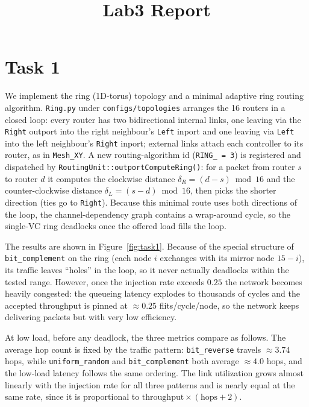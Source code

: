 \documentclass[11pt]{article}
\title{\textbf{Lab3 Report}}
\author{}
\date{}
\begin{document}
\maketitle

\section*{Task 1}

We implement the ring (1D-torus) topology and a minimal adaptive ring routing
algorithm. \texttt{Ring.py} under \texttt{configs/topologies} arranges the 16
routers in a closed loop: every router has two bidirectional internal links,
one leaving via the \texttt{Right} outport into the right neighbour's
\texttt{Left} inport and one leaving via \texttt{Left} into the left
neighbour's \texttt{Right} inport; external links attach each controller to
its router, as in \texttt{Mesh\_XY}. A new routing-algorithm id
(\texttt{RING\_ = 3}) is registered and dispatched by
\texttt{RoutingUnit::outportComputeRing()}: for a packet from router $s$ to
router $d$ it computes the clockwise distance $\delta_R = (d-s) \bmod 16$ and
the counter-clockwise distance $\delta_L = (s-d) \bmod 16$, then picks the
shorter direction (ties go to \texttt{Right}). Because this minimal route uses
both directions of the loop, the channel-dependency graph contains a
wrap-around cycle, so the single-VC ring deadlocks once the offered load fills
the loop.

The results are shown in Figure~\ref{fig:task1}. Because of the special
structure of \texttt{bit\_complement} on the ring (each node $i$ exchanges
with its mirror node $15-i$), its traffic leaves ``holes'' in the loop, so it
never actually deadlocks within the tested range. However, once the injection
rate exceeds $0.25$ the network becomes heavily congested: the queueing
latency explodes to thousands of cycles and the accepted throughput is pinned
at $\approx 0.25$ flits/cycle/node, so the network keeps delivering packets but
with very low efficiency.

At low load, before any deadlock, the three metrics compare as follows. The
average hop count is fixed by the traffic pattern: \texttt{bit\_reverse}
travels $\approx 3.74$ hops, while \texttt{uniform\_random} and
\texttt{bit\_complement} both average $\approx 4.0$ hops, and the low-load
latency follows the same ordering. The link utilization grows almost linearly
with the injection rate for all three patterns and is nearly equal at the same
rate, since it is proportional to $\text{throughput} \times (\text{hops}+2)$.
\end{document}
